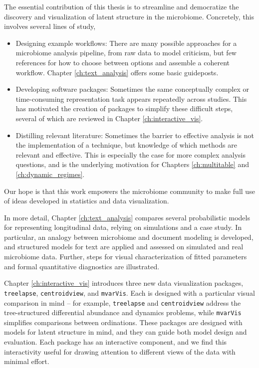 The essential contribution of this thesis is to streamline and democratize the
discovery and visualization of latent structure in the microbiome. Concretely,
this involves several lines of study,
\begin{itemize}
  \item Designing example workflows: There are many possible approaches for a
    microbiome analysis pipeline, from raw data to model criticism, but few
    references for how to choose between options and assemble a coherent
    workflow. Chapter \ref{ch:text_analysis} offers some basic guideposts.
  \item Developing software packages: Sometimes the same conceptually complex or
    time-consuming representation task appears repeatedly across studies. This
    has motivated the creation of packages to simplify these difficult steps,
    several of which are reviewed in Chapter \ref{ch:interactive_vis}.
  \item Distilling relevant literature: Sometimes the barrier to effective
    analysis is not the implementation of a technique, but knowledge of which
    methods are relevant and effective. This is especially the case for more
    complex analysis questions, and is the underlying motivation for
    Chapters \ref{ch:multitable} and \ref{ch:dynamic_regimes}.
\end{itemize}
Our hope is that this work empowers the microbiome community to make full use of
ideas developed in statistics and data visualization.

In more detail, Chapter \ref{ch:text_analysis} compares several probabilistic
models for representing longitudinal data, relying on simulations and a case
study. In particular, an analogy between microbiome and document modeling is
developed, and structured models for text are applied and assessed on simulated
and real microbiome data. Further, steps for visual characterization of fitted
parameters and formal quantitative diagnostics are illustrated.

Chapter \ref{ch:interactive_vis} introduces three new data visualization
packages, \texttt{treelapse}, \texttt{centroidview}, and \texttt{mvarVis}. Each
is designed with a particular visual comparison in mind -- for example,
\texttt{treelapse} and \texttt{centroidview} address the tree-structured
differential abundance and dynamics problems, while \texttt{mvarVis} simplifies
comparisons between ordinations. These packages are designed with models for
latent structure in mind, and they can guide both model design and evaluation.
Each package has an interactive component, and we find this interactivity
useful for drawing attention to different views of the data with minimal effort.

